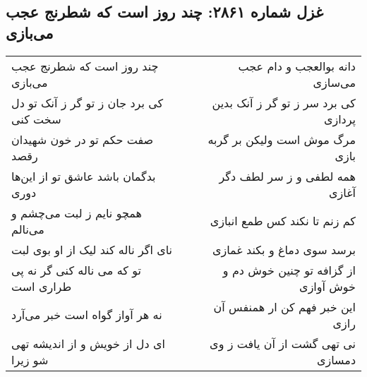 \begin{center}
\section*{غزل شماره ۲۸۶۱: چند روز است که شطرنج عجب می‌بازی}
\label{sec:2861}
\begin{longtable}{l p{0.5cm} r}
چند روز است که شطرنج عجب می‌بازی
&&
دانه بوالعجب و دام عجب می‌سازی
\\
کی برد جان ز تو گر ز آنک تو دل سخت کنی
&&
کی برد سر ز تو گر ز آنک بدین پردازی
\\
صفت حکم تو در خون شهیدان رقصد
&&
مرگ موش است ولیکن بر گربه بازی
\\
بدگمان باشد عاشق تو از این‌ها دوری
&&
همه لطفی و ز سر لطف دگر آغازی
\\
همچو نایم ز لبت می‌چشم و می‌نالم
&&
کم زنم تا نکند کس طمع انبازی
\\
نای اگر ناله کند لیک از او بوی لبت
&&
برسد سوی دماغ و بکند غمازی
\\
تو که می ناله کنی گر نه پی طراری است
&&
از گزافه تو چنین خوش دم و خوش آوازی
\\
نه هر آواز گواه است خبر می‌آرد
&&
این خبر فهم کن ار همنفس آن رازی
\\
ای دل از خویش و از اندیشه تهی شو زیرا
&&
نی تهی گشت از آن یافت ز وی دمسازی
\\
\end{longtable}
\end{center}
